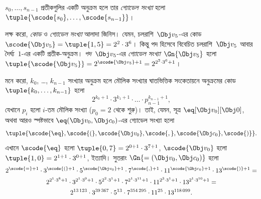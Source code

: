 \documentclass[../../../include/open-logic-section]{subfiles}
\begin{document}
\begin{defn}
$s_0, \dots, s_{n-1}$ প্রতীকগুলির একটি অনুক্রম হলে তার \emph{গ্যোডেল
  সংখ্যা} হলো $\tuple{\scode{s_0}, \dots, \scode{s_{n-1}}}$।
\end{defn}

\begin{explain}
লক্ষ করো, \emph{কোড} ও \emph{গ্যোডেল সংখ্যা} আলাদা জিনিস। যেমন,
চলরাশি~$\Obj v_5$-এর কোড~$\scode{\Obj v_5} = \tuple{1, 5} = 2^2\cdot
3^6$। কিন্তু পদ হিসেবে বিবেচিত চলরাশি~$\Obj v_5$ আবার দৈর্ঘ্য~$1$-এর
একটি প্রতীক-অনুক্রম। \emph{পদ}~$\Obj v_5$-এর \emph{গ্যোডেল সংখ্যা}~$\Gn{\Obj
v_5}$ হলো $\tuple{\scode{\Obj v_5}} = 2^{\scode{\Obj v_5} + 1} =
2^{2^2\cdot 3^6 + 1}$।
\end{explain}

\begin{ex}
মনে করো, $k_0$, \dots, $k_{n-1}$ সংখ্যার অনুক্রম হলে মৌলিক সংখ্যার
ঘাতভিত্তিক সংকেতায়নে অনুক্রমের কোড $\tuple{k_0, \dots, k_{n-1}}$ হলো
\[
2^{k_0+1}\cdot3^{k_1+1}\cdot \dots \cdot p_{n-1}^{k_{n-1}+1},
\]
যেখানে $p_i$ হলো $i$-তম মৌলিক সংখ্যা ($p_0 = 2$ থেকে শুরু)। তাই, যেমন,
সূত্র $\eq[\Obj v_0][\Obj 0]$, অথবা আরও স্পষ্টভাবে
${\eq}(\Obj v_0,\Obj c_0)$-এর গ্যোডেল সংখ্যা হলো
\[
\tuple{\scode{\eq},\scode{(},\scode{\Obj v_0},\scode{,}, \scode{\Obj
    c_0},\scode{)}}.
\]
এখানে $\scode{\eq}$ হলো $\tuple{0,7} = 2^{0+1}\cdot
3^{7+1}$, $\scode{\Obj v_0}$ হলো $\tuple{1,0} = 2^{1+1}\cdot3^{0+1}$,
ইত্যাদি। সুতরাং $\Gn{=(\Obj v_0,\Obj c_0)}$ হলো
\begin{multline*}
2^{\scode{=} + 1}\cdot 3^{\scode{(}+1}\cdot 5^{\scode{\Obj v_0}+1}
\cdot 7^{\scode{,} + 1} \cdot 11^{\scode{\Obj c_0}+1} \cdot
13^{\scode{)}+1} = \\
2^{2^1\cdot 3^8 + 1}\cdot 3^{2^1\cdot 3^9+1}\cdot 5^{2^2\cdot 3^1+1}
\cdot 7^{2^1\cdot 3^{11} + 1} \cdot 11^{2^3\cdot3^1+1} \cdot
13^{2^1\cdot3^{10}+1} = \\
2^{13\,123}\cdot 3^{39\,367}\cdot 5^{13}\cdot 7^{354\,295}\cdot11^{25}\cdot13^{118\,099}.
\end{multline*}
\end{ex}
\end{document}
